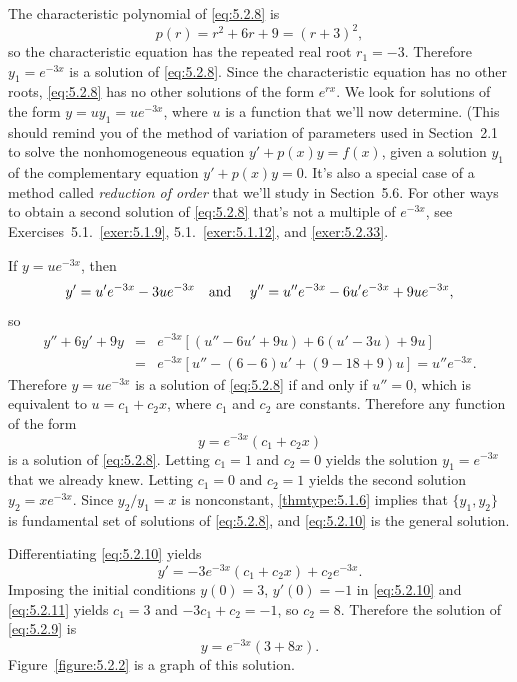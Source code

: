 \begin{examplesolution}
 The characteristic polynomial of \eqref{eq:5.2.8} is
\[
  p(r)=r^{2}+6r+9=(r+3)^{2},
\]
so the characteristic equation has the repeated real root $r_{1}=-3$. Therefore $y_{1}=e^{-3x}$ is a
solution of \eqref{eq:5.2.8}. Since the characteristic equation has no other roots, \eqref{eq:5.2.8}
has no other solutions of the form $e^{rx}$. We look for solutions of the form $y=uy_{1}=ue^{-3x}$,
where $u$ is a function that we'll now determine. (This should remind you of the method of variation
of parameters used in Section~2.1 to solve the nonhomogeneous equation $y'+p(x)y=f(x)$, given a
solution $y_{1}$ of the complementary equation $y'+p(x)y=0$. It's also a special case of a method
called {\color{blue}\it reduction of order\/} that we'll study in Section~5.6. For other ways to
obtain a second solution of \eqref{eq:5.2.8} that's not a multiple of $e^{-3x}$, see
Exercises~5.1.~\hspace*{-3pt}\ref{exer:5.1.9}, 5.1.~\hspace*{-3pt}\ref{exer:5.1.12}, and
\ref{exer:5.2.33}.

If $y=ue^{-3x}$, then
\[
  y'=u'e^{-3x}-3ue^{-3x}\mbox{\quad and \quad}y''=u''e^{-3x}-6u'e^{-3x}+9ue^{-3x},
\]
so
\begin{eqnarray*}
  y''+6y'+9y & = & e^{-3x}\left[(u''-6u'+9u)+6(u'-3u)+9u\right] \\
             & = & e^{-3x}\left[u''-(6-6)u'+(9-18+9)u\right]=u''e^{-3x}.
\end{eqnarray*}
Therefore $y=ue^{-3x}$ is a solution of \eqref{eq:5.2.8} if and only if $u''=0$, which is equivalent
to $u=c_{1}+c_{2}x$, where $c_{1}$ and $c_{2}$ are constants. Therefore any function of the form
\begin{equation}
  \label{eq:5.2.10}y=e^{-3x}(c_{1}+c_{2}x)
\end{equation}
is a solution of \eqref{eq:5.2.8}. Letting $c_{1}=1$ and $c_{2}=0$ yields the solution
$y_{1}=e^{-3x}$ that we already knew. Letting $c_{1}=0$ and $c_{2}=1$ yields the second solution
$y_{2}=xe^{-3x}$. Since $y_{2}/y_{1}=x$ is nonconstant, \ref{thmtype:5.1.6} implies that
$\{y_{1},y_{2}\}$ is fundamental set of solutions of \eqref{eq:5.2.8}, and \eqref{eq:5.2.10} is the
general solution.

 Differentiating \eqref{eq:5.2.10} yields
\begin{equation}
  \label{eq:5.2.11}y'=-3e^{-3x}(c_{1}+c_{2}x)+c_{2}e^{-3x}.
\end{equation}
Imposing the initial conditions $y(0)=3$, $y'(0)=-1$ in \eqref{eq:5.2.10} and \eqref{eq:5.2.11}
yields $c_{1}=3$ and $-3c_{1}+c_{2}=-1$, so $c_{2}=8$. Therefore the solution of \eqref{eq:5.2.9} is
\[
  y=e^{-3x}(3+8x).
\]
Figure~\ref{figure:5.2.2} is a graph of this solution.


\end{examplesolution}
